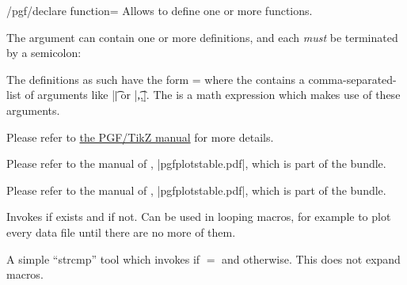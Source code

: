 \begin{key}{/pgf/declare function=}
    Allows to define one or more functions.

    The argument  can contain one or more
    definitions, and each \emph{must} be terminated by a semicolon:
\begin{codeexample}[]
\end{codeexample}
    The definitions as such have the form  =
     where the  contains a
    comma-separated-list of arguments like |\t| or |\t,\a,\b|. The
     is a math expression which makes use of these arguments.

    Please refer to \href{https://tikz.dev/}{the PGF/TikZ manual} for more details.
\end{key}

\begin{command}{\pgfplotstableread{}}
    Please refer to the manual of \PGFPlotstable{}, |pgfplotstable.pdf|, which
    is part of the \PGFPlots{} bundle.
\end{command}

\begin{command}{\pgfplotstabletypeset{}}
    Please refer to the manual of \PGFPlotstable{}, |pgfplotstable.pdf|, which
    is part of the \PGFPlots{} bundle.
\end{command}

\begin{command}{\pgfplotsiffileexists{}}
    Invokes  if  exists and  if
    not. Can be used in looping macros, for example to plot every data file
    until there are no more of them.
\end{command}

\begin{command}{\pgfplotsutilifstringequal{}}
    A simple ``strcmp'' tool which invokes  if 
    $=$ and  otherwise. This does not expand
    macros.
\end{command}


